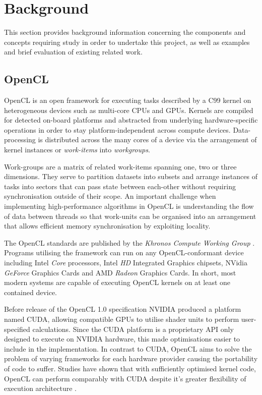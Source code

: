 \section{Background}
This section provides background information concerning the components and concepts requiring study in order to undertake this project, as well as examples and brief evaluation of existing related work.
\subsection{OpenCL}
OpenCL is an open framework for executing tasks described by a C99 kernel on heterogeneous devices such as multi-core CPUs and GPUs. Kernels are compiled for detected on-board platforms and abstracted from underlying hardware-specific operations in order to stay platform-independent across compute devices. Data-processing is distributed across the many cores of a device via the arrangement of kernel instances or \emph{work-items} into \emph{workgroups}.

Work-groups are a matrix of related work-items spanning one, two or three dimensions. They serve to partition datasets into subsets and arrange instances of tasks into sectors that can pass state between each-other without requiring synchronisation outside of their scope. An important challenge when implementing high-performance algorithms in OpenCL is understanding the flow of data between threads so that work-units can be organised into an arrangement that allows efficient memory synchronisation by exploiting locality. \cite{bestpractice}

The OpenCL standards are published by the \emph{Khronos Compute Working Group} \cite{khronos}.
Programs utilising the framework can run on any OpenCL-conformant device including Intel \emph{Core} processors, Intel \emph{HD} Integrated Graphics chipsets, NVidia \emph{GeForce} Graphics Cards and AMD \emph{Radeon} Graphics Cards.
In short, most modern systems are capable of executing OpenCL kernels on at least one contained device.

Before release of the OpenCL 1.0 specification NVIDIA produced a platform named \ac{CUDA}, allowing compatible GPUs to utilise shader units to perform user-specified calculations. Since the CUDA platform is a proprietary API only designed to execute on NVIDIA hardware, this made optimisations easier to include in the implementation. In contrast to CUDA, OpenCL aims to solve the problem of varying frameworks for each hardware provider causing the portability of code to suffer. Studies have shown that with sufficiently optimised kernel code, OpenCL can perform comparably with CUDA despite it's greater flexibility of execution architecture \cite{perf}.
